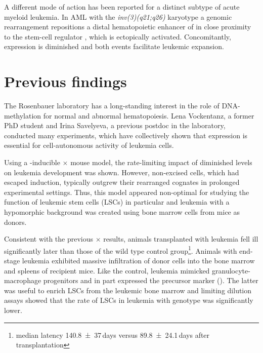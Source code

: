 A different mode of action has been reported for a distinct subtype of acute myeloid leukemia. In AML with the \emph{inv(3)(q21;q26)} karyotype\cite{Arber2016} a genomic rearrangement repositions a distal hematopoietic enhancer of  in close proximity to the stem-cell regulator , which is ectopically activated. Concomitantly,  expression is diminished and both events facilitate leukemic expansion\cite{Yamazaki2014,Groeschel2014}. 

\section{Previous findings}
\label{chap:i:abridged:project:previous_results}

The Rosenbauer laboratory has a long-standing interest in the role of DNA-methylation for normal and abnormal hematopoiesis\cite{Broeske2009,Vockentanz2010}. Lena Vockentanz, a former PhD student\cite{Vockentanz2011} and Irina Savelyeva, a previous postdoc in the laboratory, conducted many experiments, which have collectively shown that  expression is essential for cell-autonomous activity of \mllafnine leukemia cells. 

Using a \polyic-inducible \mllafnine \cremx \ensuremath{\times} \dnmtfloxchip mouse model, the rate-limiting impact of diminished  levels on leukemia development was shown. However, non-excised \dnmtfloxchip cells, which had escaped induction, typically outgrew their rearranged cognates in prolonged experimental settings. Thus, this model appeared non-optimal for studying the function of leukemic stem cells (LSCs) in particular and \mllafnine leukemia with a  hypomorphic background was created using bone marrow cells from \dnmtchip mice\cite{Li1992,Tucker1996,Gaudet2003} as donors.

Consistent with the previous \mllafnine \cremx \ensuremath{\times} \dnmtfloxchip results, animals transplanted with \dnmtchip \mllafnine leukemia fell ill significantly later than those of the wild type control group\footnote{median latency \num[separate-uncertainty = true]{140.8\pm37}\,days versus \num[separate-uncertainty = true]{89.8\pm24.1}\,days after transplantation}. Animals with end-stage leukemia exhibited massive infiltration of donor \mllafninegfp cells into the bone marrow and spleens of recipient mice. Like the \dnmtwt control, \dnmtchip \mllafnine leukemia mimicked \cdelevenbpos granulocyte-macrophage progenitors and in part expressed the precursor marker \cdonehundretseventeenpos (\kit). The latter was useful to enrich LSCs from the leukemic bone marrow\cite{Krivtsov2006,Somervaille2006} and limiting dilution assays showed that the rate of LSCs in leukemia with \dnmtchip genotype was significantly lower\cite{Vockentanz2011}. 

